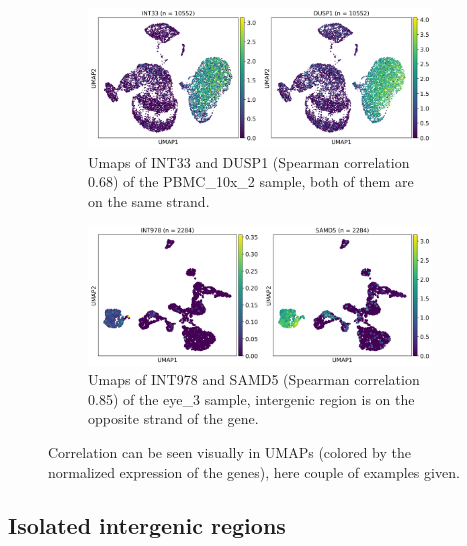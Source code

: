 \begin{figure}[htbp]
    \centering
    \begin{subfigure}{\textwidth}
        \centering
        \includegraphics[width=\textwidth]{images/correlationUmaps/PBMC_10x_2_DUSP1.png}
        \caption{Umaps of INT33 and DUSP1 (Spearman correlation 0.68) of the PBMC\_10x\_2 sample, both of them are on the same strand.}
    \end{subfigure}
    \vspace{0.5em}
    \begin{subfigure}{\textwidth}
        \centering
        \includegraphics[width=\textwidth]{images/correlationUmaps/eye_3_SAMD5.png}
        \caption{Umaps of INT978 and SAMD5 (Spearman correlation 0.85) of the eye\_3 sample,
        intergenic region is on the opposite strand of the gene.}
    \end{subfigure}
    \caption{Correlation can be seen visually in UMAPs (colored by the normalized expression of the genes), here couple of examples given.}
    \label{fig:correlationUmaps}
\end{figure}



\subsection{Isolated intergenic regions}

